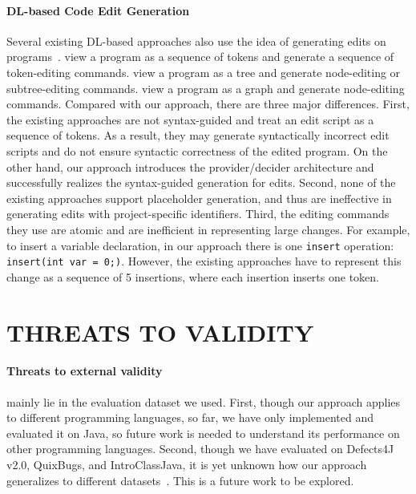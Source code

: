 \paragraph{\textbf{DL-based Code Edit Generation}}
Several existing DL-based approaches also use the idea of generating edits on programs~\cite{yasunaga2020graphbased,DBLP:journals/corr/abs-1911-01205,structuralChange,Dinella2020HOPPITY, cao2020}. \citet{DBLP:journals/corr/abs-1911-01205} view a program as a sequence of tokens and generate a sequence of token-editing commands. \citet{structuralChange} view a program as a tree and generate node-editing or subtree-editing commands. \citet{Dinella2020HOPPITY} view a program as a graph and generate node-editing commands. Compared with our approach, there are three major differences. First, the existing approaches are not syntax-guided and treat an edit script as a sequence of tokens. As a result, they may generate syntactically incorrect edit scripts and do not ensure syntactic correctness of the edited program. On the other hand, our approach introduces the provider/decider architecture and successfully realizes the syntax-guided generation for edits. Second, none of the existing approaches support placeholder generation, and thus are ineffective in generating edits with project-specific identifiers. Third, the editing commands they use are atomic and are inefficient in representing large changes. For example, to insert a variable declaration, in our approach there is one {\tt insert} operation: {\tt insert(int var = 0;)}. However, the existing approaches have to represent this change as a sequence of 5 insertions, where each insertion inserts one token. 

\section{THREATS TO VALIDITY}
\paragraph{\textbf{Threats to external validity}} mainly lie in the evaluation dataset we used. First, though our approach applies to different programming languages, so far, we have only implemented and evaluated it on Java, so future work is needed to understand its performance on other programming languages. Second, though we have evaluated on Defects4J v2.0, QuixBugs, and IntroClassJava, it is yet unknown how our approach generalizes to different datasets~\cite{JiangLNZH21}. This is a future work to be explored. 
